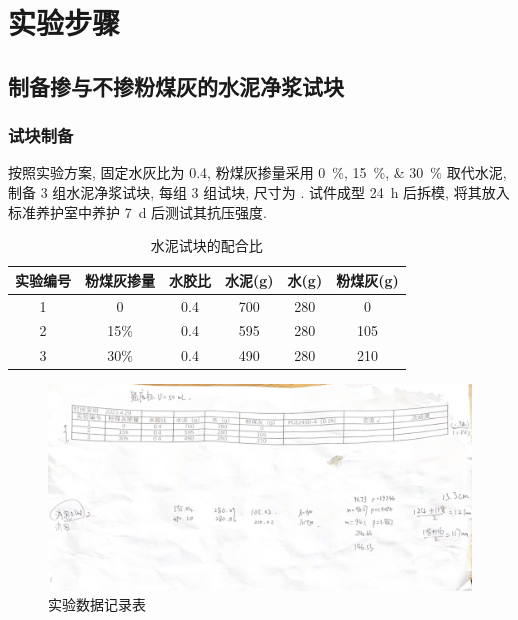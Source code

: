 
\section{实验步骤}

\subsection{制备掺与不掺粉煤灰的水泥净浆试块}

\subsubsection{试块制备}
按照实验方案, 固定水灰比为 \num{0.4}, 粉煤灰掺量采用 \qtylist{0; 15; 30}{\percent} 取代水泥, 制备 3 组水泥净浆试块, 每组 3 组试块, 尺寸为 .
试件成型 \SI{24}{\hour} 后拆模, 将其放入标准养护室中养护 \SI{7}{\day} 后测试其抗压强度.
\begin{table}[!t]
    \centering
    \caption{水泥试块的配合比}
    \begin{tabular}{|c|c|c|c|c|c|}
    \hline
    实验编号 & 粉煤灰掺量 & 水胶比 & 水泥(g) & 水(g) & 粉煤灰(g) \\ \hline
    1    & 0      & 0.4 & 700   & 280  & 0      \\ \hline
    2    & 15\%   & 0.4 & 595   & 280  & 105    \\ \hline
    3    & 30\%   & 0.4 & 490   & 280  & 210    \\ \hline
    \end{tabular}
    
\end{table}
\begin{figure}
    \centering
    
    \includegraphics[width = 0.7 \linewidth]{figures/exp1/record table.png}
    \caption{实验数据记录表}
\end{figure}

